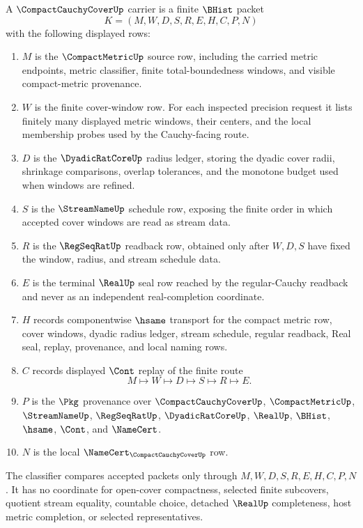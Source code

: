 \begin{definition}
\label{def:compact-cauchy-cover-carrier}
A $\CompactCauchyCoverUp$ carrier is a finite $\BHist$ packet
$$
K=(M,W,D,S,R,E,H,C,P,N)
$$
with the following displayed rows:
\begin{enumerate}
\item $M$ is the $\CompactMetricUp$ source row, including the carried metric endpoints, metric classifier, finite total-boundedness windows, and visible compact-metric provenance.
\item $W$ is the finite cover-window row. For each inspected precision request it lists finitely many displayed metric windows, their centers, and the local membership probes used by the Cauchy-facing route.
\item $D$ is the $\DyadicRatCoreUp$ radius ledger, storing the dyadic cover radii, shrinkage comparisons, overlap tolerances, and the monotone budget used when windows are refined.
\item $S$ is the $\StreamNameUp$ schedule row, exposing the finite order in which accepted cover windows are read as stream data.
\item $R$ is the $\RegSeqRatUp$ readback row, obtained only after $W,D,S$ have fixed the window, radius, and stream schedule data.
\item $E$ is the terminal $\RealUp$ seal row reached by the regular-Cauchy readback and never as an independent real-completion coordinate.
\item $H$ records componentwise $\hsame$ transport for the compact metric row, cover windows, dyadic radius ledger, stream schedule, regular readback, Real seal, replay, provenance, and local naming rows.
\item $C$ records displayed $\Cont$ replay of the finite route
$$
M \longmapsto W \longmapsto D \longmapsto S \longmapsto R \longmapsto E .
$$
\item $P$ is the $\Pkg$ provenance over $\CompactCauchyCoverUp$, $\CompactMetricUp$, $\StreamNameUp$, $\RegSeqRatUp$, $\DyadicRatCoreUp$, $\RealUp$, $\BHist$, $\hsame$, $\Cont$, and $\NameCert$.
\item $N$ is the local $\NameCert_{\CompactCauchyCoverUp}$ row.
\end{enumerate}
The classifier compares accepted packets only through $M,W,D,S,R,E,H,C,P,N$. It has no coordinate for open-cover compactness, selected finite subcovers, quotient stream equality, countable choice, detached $\RealUp$ completeness, host metric completion, or selected representatives.
\end{definition}

